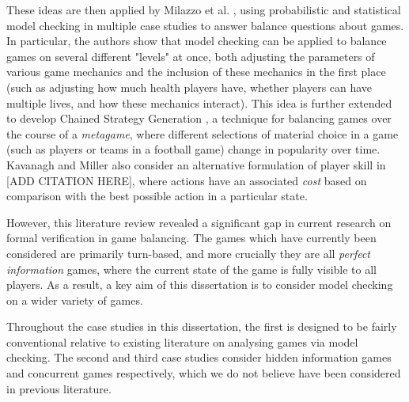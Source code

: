 These ideas are then applied by Milazzo et al. \cite{milazzo_case_2015}, using probabilistic and statistical model checking in multiple case studies to answer balance questions about games. In particular, the authors show that model checking can be applied to balance games on several different "levels" at once, both adjusting the parameters of various game mechanics and the inclusion of these mechanics in the first place (such as adjusting how much health players have, whether players can have multiple lives, and how these mechanics interact). This idea is further extended to develop Chained Strategy Generation \cite{kavanagh_balancing_2019}, a technique for balancing games over the course of a \emph{metagame}, where different selections of material choice in a game (such as players or teams in a football game) change in popularity over time. Kavanagh and Miller also consider an alternative formulation of player skill in [ADD CITATION HERE], where actions have an associated \emph{cost} based on comparison with the best possible action in a particular state. 

However, this literature review revealed a significant gap in current research on formal verification in game balancing. The games which have currently been considered are primarily turn-based, and more crucially they are all \emph{perfect information} games, where the current state of the game is fully visible to all players. As a result, a key aim of this dissertation is to consider model checking on a wider variety of games.

Throughout the case studies in this dissertation, the first is designed to be fairly conventional relative to existing literature on analysing games via model checking. The second and third case studies consider hidden information games and concurrent games respectively, which we do not believe have been considered in previous literature.
